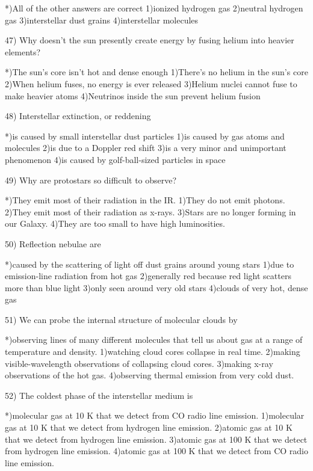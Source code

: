  *)All of the other answers are correct
 1)ionized hydrogen gas
 2)neutral hydrogen gas
 3)interstellar dust grains
 4)interstellar molecules
 
47) Why doesn't the sun presently create energy by fusing helium into
    heavier elements?
 
 *)The sun's core isn't hot and dense enough
 1)There's no helium in the sun's core
 2)When helium fuses, no energy is ever released
 3)Helium nuclei cannot fuse to make heavier atoms
 4)Neutrinos inside the sun prevent helium fusion
 
48) Interstellar extinction, or reddening
 
 *)is caused by small interstellar dust particles
 1)is caused by gas atoms and molecules
 2)is due to a Doppler red shift
 3)is a very minor and unimportant phenomenon
 4)is caused by golf-ball-sized particles in space
 
49) Why are protostars so difficult to observe?
 
 *)They emit most of their radiation in the IR.
 1)They do not emit photons.
 2)They emit most of their radiation as x-rays.
 3)Stars are no longer forming in our Galaxy.
 4)They are too small to have high luminosities.
 
50) Reflection nebulae are
 
 *)caused by the scattering of light off dust grains around young stars
 1)due to emission-line radiation from hot gas
 2)generally red because red light scatters more than blue light
 3)only seen around very old stars
 4)clouds of very hot, dense gas
 
51) We can probe the internal structure of molecular clouds by
 
 *)observing lines of many different molecules that tell us about gas
   at a range of temperature and density.
 1)watching cloud cores collapse in real time.
 2)making visible-wavelength observations of collapsing cloud cores.
 3)making x-ray observations of the hot gas.
 4)observing thermal emission from very cold dust.
 
52) The coldest phase of the interstellar medium is
 
 *)molecular gas at 10 K that we detect from CO radio line emission.
 1)molecular gas at 10 K that we detect from hydrogen line emission.
 2)atomic gas at 10 K that we detect from hydrogen line emission.
 3)atomic gas at 100 K that we detect from hydrogen line emission.
 4)atomic gas at 100 K that we detect from CO radio line emission.
 
